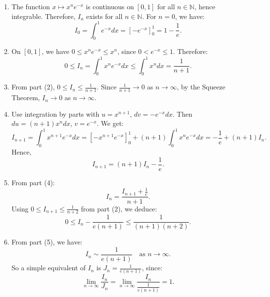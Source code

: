 \documentclass[12pt]{article}
\begin{document}
\begin{answerbox}
  \begin{enumerate}
    \item The function $ x \mapsto x^n e^{-x} $ is continuous on $[0, 1]$ for all $ n \in \mathbb{N} $, hence integrable. Therefore, $ I_n $ exists for all $ n \in \mathbb{N} $. For $ n = 0 $, we have:
    $$
    I_0 = \int_0^1 e^{-x} dx = \left[ -e^{-x} \right]_0^1 = 1 - \frac{1}{e}.
    $$

    \item On $ [0, 1] $, we have $ 0 \leq x^n e^{-x} \leq x^n $, since $ 0 < e^{-x} \leq 1 $. Therefore:
    $$
    0 \leq I_n = \int_0^1 x^n e^{-x} dx \leq \int_0^1 x^n dx = \frac{1}{n+1}.
    $$

    \item From part (2), $ 0 \leq I_n \leq \frac{1}{n+1} $. Since $ \frac{1}{n+1} \to 0 $ as $ n \to \infty $, by the Squeeze Theorem, $ I_n \to 0 $ as $ n \to \infty $.

    \item Use integration by parts with $ u = x^{n+1} $, $ dv = -e^{-x} dx $. Then $ du = (n+1)x^n dx $, $ v = e^{-x} $. We get:
    $$
    I_{n+1} = \int_0^1 x^{n+1} e^{-x} dx = \left[ -x^{n+1} e^{-x} \right]_0^1 + (n+1) \int_0^1 x^n e^{-x} dx = -\frac{1}{e} + (n+1) I_n.
    $$
    Hence,
    $$
    I_{n+1} = (n+1) I_n - \frac{1}{e}.
    $$

    \item From part (4):
    $$
    I_n = \frac{I_{n+1} + \frac{1}{e}}{n+1}.
    $$
    Using $ 0 \leq I_{n+1} \leq \frac{1}{n+2} $ from part (2), we deduce:
    $$
    0 \leq I_n - \frac{1}{e(n+1)} \leq \frac{1}{(n+1)(n+2)}.
    $$

    \item From part (5), we have:
    $$
    I_n \sim \frac{1}{e(n+1)} \quad \text{as } n \to \infty.
    $$
    So a simple equivalent of $ I_n $ is $ J_n = \frac{1}{e(n+1)} $, since:
    $$
    \lim_{n \to \infty} \frac{I_n}{J_n} = \lim_{n \to \infty} \frac{I_n}{\frac{1}{e(n+1)}} = 1.
    $$
\end{enumerate}
\end{answerbox}

\end{document}
